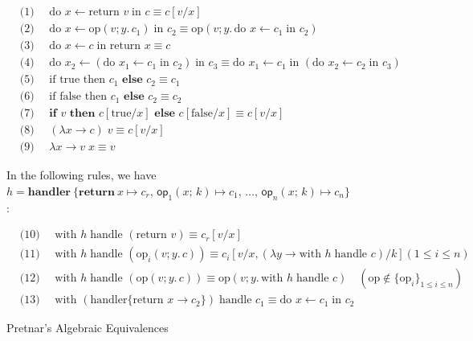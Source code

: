 \documentclass[logo,bsc,singlespacing,parskip]{infthesis}
\begin{document}
\begin{figure}[H]
    \centering
    \begin{tcolorbox}[colframe=black, colback=white, sharp corners]
    \begin{align*}
        &\text{(1) } \quad \text{do } x \leftarrow \text{return } v \; \text{in } c \equiv c[v/x] \\
        &\text{(2) } \quad \text{do } x \leftarrow \text{op}(v; y.\, c_1) \; \text{in } c_2 \equiv \text{op}(v; y.\, \text{do } x \leftarrow c_1 \; \text{in } c_2) \\
        &\text{(3) } \quad \text{do } x \leftarrow c \; \text{in return } x \equiv c \\
        &\text{(4) } \quad \text{do } x_2 \leftarrow (\text{do } x_1 \leftarrow c_1 \; \text{in } c_2) \; \text{in } c_3 \equiv \text{do } x_1 \leftarrow c_1 \; \text{in } (\text{do } x_2 \leftarrow c_2 \; \text{in } c_3) \\
        &\text{(5) } \quad \text{if true then } c_1 \textbf{ else } c_2 \equiv c_1 \\
        &\text{(6) } \quad \text{if false then } c_1 \textbf{ else } c_2 \equiv c_2 \\
        &\text{(7) } \quad \textbf{if } v \textbf{ then } c[\text{true}/x] \textbf{ else } c[\text{false}/x] \equiv c[v/x] \\
        &\text{(8) } \quad (\lambda x \rightarrow c) \; v \equiv c[v/x] \\
        &\text{(9) } \quad \lambda x \rightarrow v \; x \equiv v 
    \end{align*}
    \end{tcolorbox}
In the following rules, we have \( h = \mathbf{handler}\ \{ \mathbf{return}\ x \mapsto c_r,\, \mathsf{op}_1(x;\,k) \mapsto c_1,\, \ldots,\, \mathsf{op}_n(x;\,k) \mapsto c_n \} \):
    \begin{tcolorbox}[colframe=black, colback=white, sharp corners]
    \begin{align*}
        &\text{(10) } \quad \text{with } h \; \text{handle } (\text{return } v) \equiv c_r[v/x] \\
        &\text{(11) } \quad \text{with } h \; \text{handle } (\text{op}_i(v; y.\, c)) \equiv c_i[v/x, (\lambda y \rightarrow \text{with } h \; \text{handle } c)/k]  (1 \leq i \leq n) \\
        &\text{(12) } \quad \text{with } h \; \text{handle } (\text{op}(v; y.\, c)) \equiv \text{op}(v; y.\, \text{with } h \; \text{handle } c) \quad (\text{op} \notin \{\text{op}_i\}_{1 \leq i \leq n}) \\
        &\text{(13) } \quad \text{with } (\text{handler} \{\text{return } x \rightarrow c_2\}) \; \text{handle } c_1 \equiv \text{do } x \leftarrow c_1 \; \text{in } c_2
    \end{align*}
    \end{tcolorbox}

    \caption{Pretnar's Algebraic Equivalences}
    \label{fig:equational-laws}
\end{figure}
\end{document}
